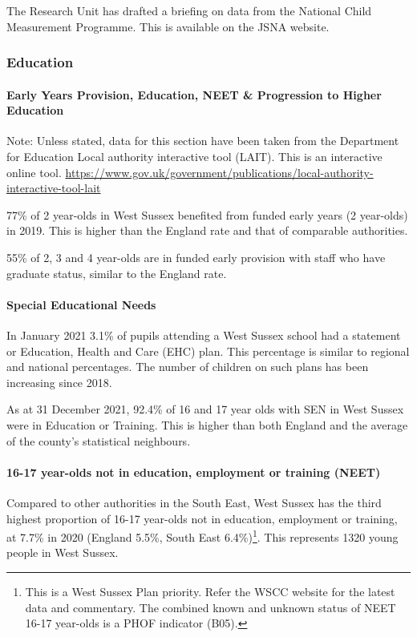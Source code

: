 The Research Unit has drafted a briefing on data from the National Child Measurement Programme. This is available on the JSNA website.

\subsubsection{Education}
\paragraph{Early Years Provision, Education, NEET \& Progression to Higher Education}
Note: Unless stated, data for this section have been taken from the Department for Education Local authority interactive tool (LAIT). This is an interactive online tool. \url{https://www.gov.uk/government/publications/local-authority-interactive-tool-lait}

77\% of 2 year-olds in West Sussex benefited from funded early years (2 year-olds) in 2019. This is higher than the England rate and that of comparable authorities.

55\% of 2, 3 and 4 year-olds are in funded early provision with staff who have graduate status, similar to the England rate.

\paragraph{Special Educational Needs}

In January 2021 3.1\% of pupils attending a West Sussex school had a statement or Education, Health and Care (EHC) plan. This percentage is similar to regional and national percentages. The number of children on such plans has been increasing since 2018.


As at 31 December 2021, 92.4\% of 16 and 17 year olds with SEN in West Sussex were in Education or Training. This is higher than both England and the average of the county's statistical neighbours.

\paragraph{16-17 year-olds not in education, employment or training (NEET)}

Compared to other authorities in the South East, West Sussex has the third highest proportion of 16-17 year-olds not in education, employment or training, at 7.7\% in 2020 (England 5.5\%, South East 6.4\%)\footnote{This is a West Sussex Plan priority. Refer the WSCC website for the latest data and commentary. The combined known and unknown status of NEET 16-17 year-olds is a PHOF indicator (B05).}. This represents 1320 young people in West Sussex.

